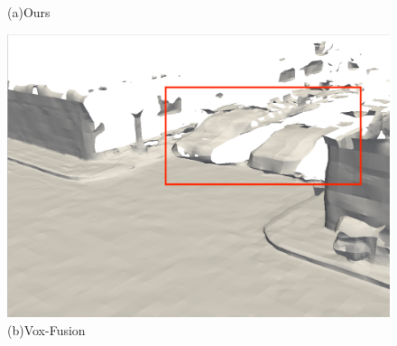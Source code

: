 \begin{figure}[htbp]
\begin{minipage}{0.5\linewidth}
    \caption*{(a)Ours}
\end{minipage}\hfill
\begin{minipage}{0.5\linewidth}
    \centering
    \includegraphics[width=1\linewidth]{figures/mai_2_bce.png}
    \caption*{(b)Vox-Fusion}
\end{minipage}
\end{figure}

